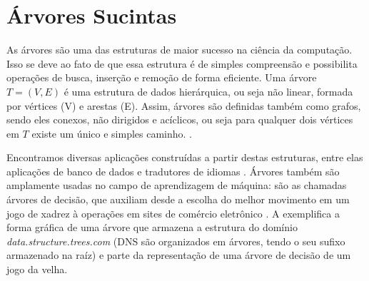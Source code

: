 \section{Árvores Sucintas}
As árvores são uma das estruturas de maior sucesso na ciência da computação. Isso se deve ao fato de que essa estrutura é de simples compreensão e possibilita operações de busca, inserção e remoção de forma eficiente.
Uma árvore $T=(V,E)$ é uma estrutura de dados hierárquica, ou seja não linear, formada por vértices (V) e arestas (E). Assim, árvores são definidas também como grafos, sendo eles conexos, não dirigidos e acíclicos, 
ou seja para qualquer dois vértices em $T$ existe um único e simples caminho. \citep{book-algoritmos-teoria-pratica}.

Encontramos diversas aplicações construídas a partir destas estruturas, entre elas aplicações de banco de dados e tradutores de idiomas \citep{book-algoritmos-teoria-pratica}. Árvores também são amplamente usadas no campo de aprendizagem de máquina: são as chamadas árvores de decisão, que auxiliam desde a escolha do melhor movimento em um jogo de xadrez  à operações em sites de comércio eletrônico \citep{book-inteligencia-artificial}.
A  exemplifica a forma gráfica de uma árvore que armazena a estrutura do domínio \textit{data.structure.trees.com} (DNS são organizados em árvores, tendo o seu sufixo armazenado na raíz) e parte da representação de  uma árvore de decisão de um jogo da velha.

